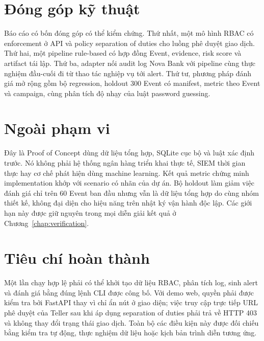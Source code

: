 \section{Đóng góp kỹ thuật}

Báo cáo có bốn đóng góp có thể kiểm chứng. Thứ nhất, một mô hình RBAC có
enforcement ở API và policy separation of duties cho luồng phê duyệt giao dịch.
Thứ hai, một pipeline rule-based có hợp đồng Event, evidence, risk score và
artifact tái lập. Thứ ba, adapter nối audit log Nova Bank với pipeline cùng
thực nghiệm đầu-cuối đi từ thao tác nghiệp vụ tới alert. Thứ tư, phương pháp đánh
giá mở rộng gồm bộ regression, holdout 300 Event có manifest, metric theo Event
và campaign, cùng phân tích độ nhạy của luật password guessing.

\section{Ngoài phạm vi}

Đây là Proof of Concept dùng dữ liệu tổng hợp, SQLite cục bộ và luật xác định
trước. Nó không phải hệ thống ngân hàng triển khai thực tế, SIEM thời gian
thực hay cơ chế phát hiện dùng machine learning. Kết quả metric chứng minh
implementation khớp với scenario có nhãn của dự án. Bộ holdout làm giảm việc
đánh giá chỉ trên 60 Event ban đầu nhưng vẫn là dữ liệu tổng hợp do cùng nhóm
thiết kế, không đại diện cho hiệu năng trên nhật ký vận hành độc lập. Các giới
hạn này được giữ nguyên trong mọi diễn giải kết quả ở
Chương~\ref{chap:verification}.

\section{Tiêu chí hoàn thành}

Một lần chạy hợp lệ phải có thể khởi tạo dữ liệu RBAC, phân tích log, sinh
alert và đánh giá bằng đúng lệnh CLI được công bố. Với demo web, quyền phải
được kiểm tra bởi FastAPI thay vì chỉ ẩn nút ở giao diện; việc truy cập trực
tiếp URL phê duyệt của Teller sau khi áp dụng separation of duties phải trả về
HTTP 403 và không thay đổi trạng thái giao dịch. Toàn bộ các điều kiện này được
đối chiếu bằng kiểm tra tự động, thực nghiệm dữ liệu hoặc kịch bản trình diễn
tương ứng.
